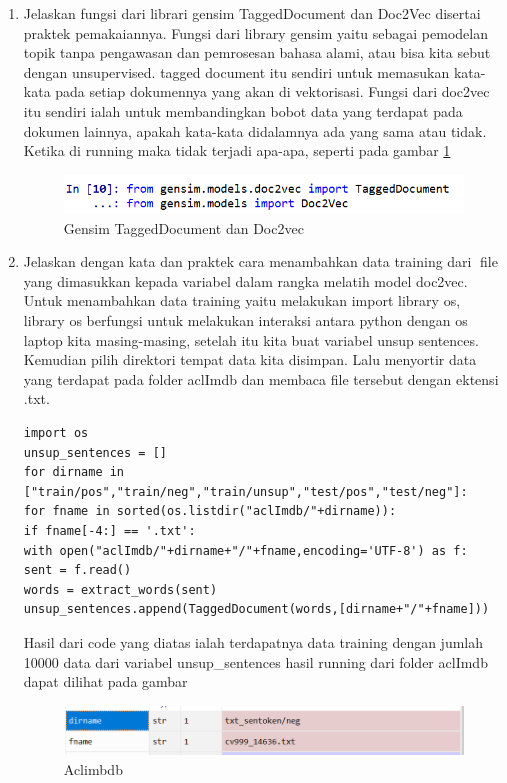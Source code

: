 \begin{enumerate}
\item Jelaskan fungsi dari librari gensim TaggedDocument dan Doc2Vec disertai praktek pemakaiannya.
\subitem Fungsi dari library gensim yaitu sebagai pemodelan topik tanpa pengawasan dan pemrosesan bahasa alami, atau bisa kita sebut dengan unsupervised.  tagged document itu sendiri untuk memasukan kata-kata pada setiap dokumennya yang akan di vektorisasi. Fungsi dari doc2vec itu sendiri ialah untuk membandingkan bobot data yang terdapat pada dokumen lainnya, apakah kata-kata didalamnya ada yang sama atau tidak. Ketika di running maka tidak terjadi apa-apa, seperti pada gambar \ref{c5_22}
\begin{figure}[!htbp]
	\centerline{\includegraphics[width=1\textwidth]{figures/andi/T1.PNG}}
	\caption{Gensim TaggedDocument dan Doc2vec}
	\label{c5_22}
\end{figure}
\item Jelaskan dengan kata dan praktek cara menambahkan data training dari file yang dimasukkan kepada variabel dalam rangka melatih model doc2vec.
\subitem Untuk menambahkan data training yaitu melakukan import library os, library os berfungsi untuk melakukan interaksi antara python dengan os laptop kita masing-masing, setelah itu kita buat variabel unsup sentences. Kemudian pilih direktori tempat data kita disimpan. Lalu menyortir data yang terdapat pada folder aclImdb dan membaca file tersebut dengan ektensi .txt.
\begin{verbatim}
import os
unsup_sentences = []
for dirname in ["train/pos","train/neg","train/unsup","test/pos","test/neg"]:
for fname in sorted(os.listdir("aclImdb/"+dirname)):
if fname[-4:] == '.txt':
with open("aclImdb/"+dirname+"/"+fname,encoding='UTF-8') as f:
sent = f.read()
words = extract_words(sent)
unsup_sentences.append(TaggedDocument(words,[dirname+"/"+fname]))
\end{verbatim}
\subitem Hasil dari code yang diatas ialah terdapatnya data training dengan jumlah 10000 data dari variabel unsup\_sentences hasil running dari folder aclImdb dapat dilihat pada gambar 
\begin{figure}[!htbp]
	\centerline{\includegraphics[width=1\textwidth]{figures/andi/T2.PNG}}
	\caption{Aclimbdb}
	\end{figure}


\end{enumerate}
